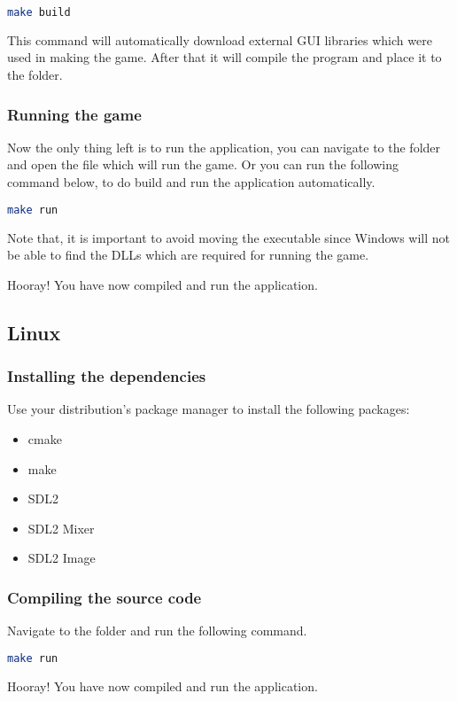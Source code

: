\begin{lstlisting}[language=bash]
make build
\end{lstlisting}

This command will automatically download external GUI libraries which were used
in making the game. After that it will compile the program and place it to the
 folder.

\subsubsection{Running the game}

Now the only thing left is to run the application, you can navigate to the 
folder and open the  file which will run the game. Or you
can run the following command below, to do build and run the application automatically.

\begin{lstlisting}[language=bash]
make run
\end{lstlisting}

Note that, it is important to avoid moving the executable since Windows will not
be able to find the DLLs which are required for running the game.

Hooray! You have now compiled and run the application.

\subsection{Linux}

\subsubsection{Installing the dependencies}

Use your distribution’s package manager to install the following packages:

\begin{itemize}
    \item cmake
    \item make
    \item SDL2
    \item SDL2 Mixer
    \item SDL2 Image
\end{itemize}

\subsubsection{Compiling the source code}
Navigate to the  folder and run the 
following command.

\begin{lstlisting}[language=bash]
make run
\end{lstlisting}

Hooray! You have now compiled and run the application.
